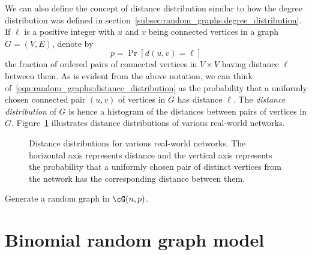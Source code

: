 We can also define the concept of distance distribution similar to how
the degree distribution was defined in
section~\ref{subsec:random_graphs:degree_distribution}. If $\ell$ is a
positive integer with $u$ and $v$ being connected vertices in a graph
$G = (V,E)$, denote by
\begin{equation}
\label{eqn:random_graphs:distance_distribution}
p
=
\Pr[d(u,v) = \ell]
\end{equation}
the fraction of ordered pairs of connected vertices in $V \times V$
having distance $\ell$ between them. As is evident from the above
notation, we can think
of~\eqref{eqn:random_graphs:distance_distribution} as the probability
that a uniformly chosen connected pair $(u,v)$ of vertices in $G$ has
distance $\ell$. The
\emph{distance distribution} of $G$ is
hence a histogram of the distances between pairs of vertices in
$G$. Figure~\ref{fig:random_graphs:distance_distribution} illustrates
distance distributions of various real-world networks.

\begin{figure}[!htbp]
\centering

\caption{Distance distributions for various real-world networks. The
  horizontal axis represents distance and the vertical axis represents
  the probability that a uniformly chosen pair of distinct vertices
  from the network has the corresponding distance between them.}
\label{fig:random_graphs:distance_distribution}
\end{figure}


\begin{algorithm}[!htbp]

\caption{Generate a random graph in $\cG(n,p)$.}
\label{alg:random_graphs:generate_random_Gnp}
\end{algorithm}



\section{Binomial random graph model}

